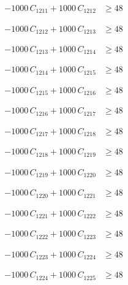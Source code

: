 \documentclass[a4paper,11pt]{article}
\begin{document}
\begin{align}
-1000\,C_{1211} + 1000\,C_{1212} &\geq 48 \nonumber
\end{align}

\begin{align}
-1000\,C_{1212} + 1000\,C_{1213} &\geq 48 \nonumber
\end{align}

\begin{align}
-1000\,C_{1213} + 1000\,C_{1214} &\geq 48 \nonumber
\end{align}

\begin{align}
-1000\,C_{1214} + 1000\,C_{1215} &\geq 48 \nonumber
\end{align}

\begin{align}
-1000\,C_{1215} + 1000\,C_{1216} &\geq 48 \nonumber
\end{align}

\begin{align}
-1000\,C_{1216} + 1000\,C_{1217} &\geq 48 \nonumber
\end{align}

\begin{align}
-1000\,C_{1217} + 1000\,C_{1218} &\geq 48 \nonumber
\end{align}

\begin{align}
-1000\,C_{1218} + 1000\,C_{1219} &\geq 48 \nonumber
\end{align}

\begin{align}
-1000\,C_{1219} + 1000\,C_{1220} &\geq 48 \nonumber
\end{align}

\begin{align}
-1000\,C_{1220} + 1000\,C_{1221} &\geq 48 \nonumber
\end{align}

\begin{align}
-1000\,C_{1221} + 1000\,C_{1222} &\geq 48 \nonumber
\end{align}

\begin{align}
-1000\,C_{1222} + 1000\,C_{1223} &\geq 48 \nonumber
\end{align}

\begin{align}
-1000\,C_{1223} + 1000\,C_{1224} &\geq 48 \nonumber
\end{align}

\begin{align}
-1000\,C_{1224} + 1000\,C_{1225} &\geq 48 \nonumber
\end{align}
\end{document}
